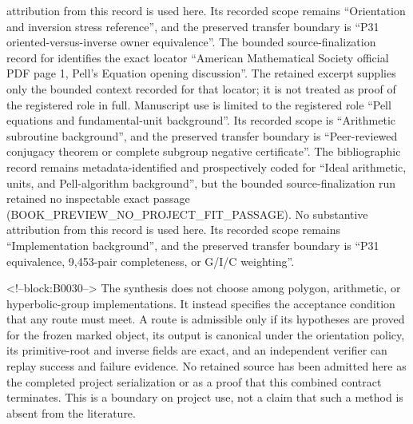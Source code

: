 \documentclass[11pt]{article}
\begin{document}
attribution from this record is used here.  Its recorded scope remains
``Orientation and inversion stress reference'', and the preserved transfer boundary is ``P31 oriented-versus-inverse owner equivalence''.
The bounded source-finalization record for \citep{P31-S19} identifies
the exact locator ``American Mathematical Society official PDF page 1, Pell’s Equation opening discussion''.  The retained excerpt supplies only the
bounded context recorded for that locator; it is not treated as proof of the
registered role in full.  Manuscript use is limited to the registered role ``Pell equations and fundamental-unit background''.
Its recorded scope is ``Arithmetic subroutine background'', and the preserved
transfer boundary is ``Peer-reviewed conjugacy theorem or complete subgroup negative certificate''.
The bibliographic record \citep{P31-S20} remains metadata-identified and
prospectively coded for ``Ideal arithmetic, units, and Pell-algorithm background'', but the bounded source-finalization
run retained no inspectable exact passage (BOOK\_PREVIEW\_NO\_PROJECT\_FIT\_PASSAGE).  No substantive
attribution from this record is used here.  Its recorded scope remains
``Implementation background'', and the preserved transfer boundary is ``P31 equivalence, 9,453-pair completeness, or G/I/C weighting''.

<!--block:B0030-->
The synthesis does not choose among polygon, arithmetic, or
hyperbolic-group implementations. It instead specifies the acceptance
condition that any route must meet. A route is admissible only if its
hypotheses are proved for the frozen marked object, its output is
canonical under the orientation policy, its primitive-root and inverse
fields are exact, and an independent verifier can replay success and
failure evidence. No retained source has been admitted here as the completed
project serialization or as a proof that this combined contract terminates.
This is a boundary on project use, not a claim that such a method is absent
from the literature.
\end{document}
